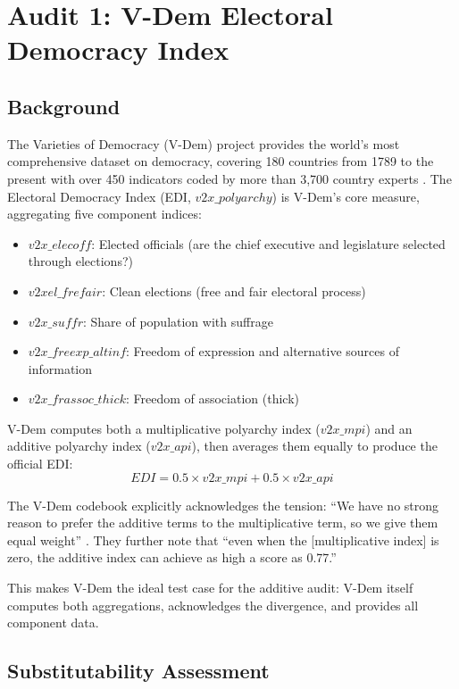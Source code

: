 \documentclass[12pt]{article}
\begin{document}
\section{Audit 1: V-Dem Electoral Democracy Index}

\subsection{Background}

The Varieties of Democracy (V-Dem) project provides the world's most comprehensive dataset on democracy, covering 180 countries from 1789 to the present with over 450 indicators coded by more than 3,700 country experts \citep{coppedge2018}. The Electoral Democracy Index (EDI, $v2x\_polyarchy$) is V-Dem's core measure, aggregating five component indices:

\begin{itemize}
\item $v2x\_elecoff$: Elected officials (are the chief executive and legislature selected through elections?)
\item $v2xel\_frefair$: Clean elections (free and fair electoral process)
\item $v2x\_suffr$: Share of population with suffrage
\item $v2x\_freexp\_altinf$: Freedom of expression and alternative sources of information
\item $v2x\_frassoc\_thick$: Freedom of association (thick)
\end{itemize}

V-Dem computes both a multiplicative polyarchy index ($v2x\_mpi$) and an additive polyarchy index ($v2x\_api$), then averages them equally to produce the official EDI:
\begin{equation}
EDI = 0.5 \times v2x\_mpi + 0.5 \times v2x\_api
\end{equation}

The V-Dem codebook explicitly acknowledges the tension: ``We have no strong reason to prefer the additive terms to the multiplicative term, so we give them equal weight'' \citep{coppedge2018}. They further note that ``even when the [multiplicative index] is zero, the additive index can achieve as high a score as 0.77.''

This makes V-Dem the ideal test case for the additive audit: V-Dem itself computes both aggregations, acknowledges the divergence, and provides all component data.

\subsection{Substitutability Assessment}
\end{document}
